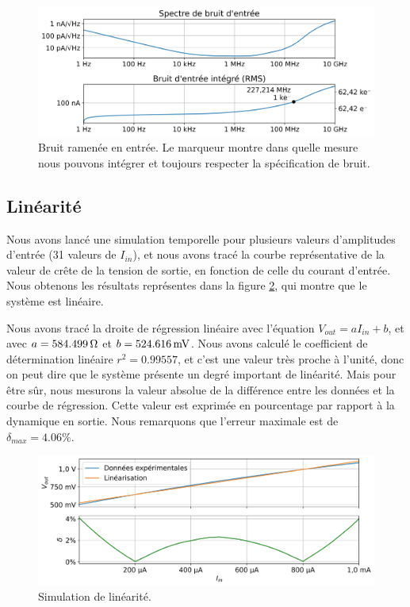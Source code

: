 \documentclass[a4paper,12pt]{article}
\numberwithin{equation}{section}
\newcommand{\?}{\stackrel{?}{=}}
\newcommand{\sis}[2]{\complexnum{#1}\,\si[per-mode=symbol]{#2}}
\begin{document}
\begin{figure}[htp!]
    \centering
    \includegraphics[width=\linewidth]{images/input_noise.png}
    \caption{Bruit ramenée en entrée. Le marqueur montre dans quelle mesure nous pouvons intégrer et toujours respecter la spécification de bruit.}
    \label{fig:input_noise}
\end{figure}

\subsection{Linéarité}

Nous avons lancé une simulation temporelle pour plusieurs valeurs d'amplitudes d'entrée (31 valeurs de $I_{in}$), et nous avons tracé la courbe représentative de la valeur de crête de la tension de sortie, en fonction de celle du courant d'entrée. Nous obtenons les résultats représentes dans la figure \ref{fig:lin_test}, qui montre que le système est linéaire.

Nous avons tracé la droite de régression linéaire avec l'équation $V_{out}=aI_{in}+b$, et avec $a=\sis{584.499}{\ohm}$ et $b=\sis{524.616}{\milli\volt}$. Nous avons calculé le coefficient de détermination linéaire $r^2=\num{0.99557}$, et c'est une valeur très proche à l'unité, donc on peut dire que le système présente un degré important de linéarité. Mais pour être sûr, nous mesurons la valeur absolue de la différence entre les données et la courbe de régression. Cette valeur est exprimée en pourcentage par rapport à la dynamique en sortie. Nous remarquons que l'erreur maximale est de $\delta_{max}=\num{4.06}\%$. 


\begin{figure}[htp!]
    \centering
    \includegraphics[width=\linewidth]{images/lin_test.png}
    \caption{Simulation de linéarité.}
    \label{fig:lin_test}
\end{figure}
\end{document}
